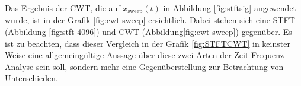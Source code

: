 Das Ergebnis der CWT, die auf $x_{\text{sweep}}(t)$ in Abbildung \ref{fig:stftsig} angewendet wurde, ist in der Grafik \ref{fig:cwt-sweep} ersichtlich. Dabei stehen sich eine STFT (Abbildung \ref{fig:stft-4096}) und CWT (Abbildung\ref{fig:cwt-sweep}) gegenüber. Es ist zu beachten, dass dieser Vergleich in der Grafik \ref{fig:STFTCWT} in keinster Weise eine allgemeingültige Aussage über diese zwei Arten der Zeit-Frequenz-Analyse sein soll, sondern mehr eine Gegenüberstellung zur Betrachtung von Unterschieden. 


